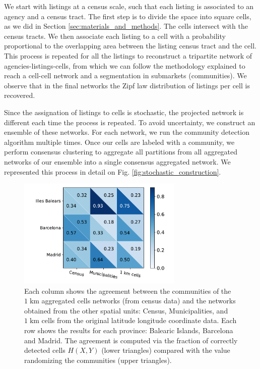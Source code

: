 We start with listings at a census scale, such that each listing is associated to an agency and a census tract. The first step is to divide the space into square cells, as we did in Section \ref{sec:materials_and_methods}. The cells intersect with the census tracts. We then associate each listing to a cell with a probability proportional to the overlapping area between the listing census tract and the cell. This process is repeated for all the listings to reconstruct a tripartite network of agencies-listings-cells, from which we can follow the methodology explained to reach a cell-cell network and a segmentation in submarkets (communities). 
We observe that in the final networks the Zipf law distribution of listings per cell is recovered.

Since the assignation of listings to cells is stochastic, the projected network is different each time the process is repeated. To avoid uncertainty, we construct an ensemble of these networks. For each network, we run the community detection algorithm multiple times. Once our cells are labeled with a community, we perform consensus clustering to aggregate all partitions from all aggregated networks of our ensemble into a single consensus aggregated network. We represented this process in detail on Fig. \ref{fig:stochastic_construction}.

\begin{figure}
    \centering
    \includegraphics[width = 0.7\textwidth]{Figs/Idealista_segmentation/Cells1000_agreement_AggCells.pdf}
	\caption[Comparison between the communities from aggregated cells network and other spatial units.]{ Each column shows the agreement between the communities of the $1 \; \textrm{km}$ aggregated cells networks (from census data) and the networks obtained from the other spatial units: Census, Municipalities, and $1 \; \textrm{km}$ cells from the original latitude longitude coordinate data. Each row shows the results for each province: Balearic Islands, Barcelona and Madrid. The agreement is computed via the fraction of correctly detected cells $H(X,Y)$ (lower triangles) compared with the value randomizing the communities (upper triangles). \label{fig:network_sector_distribution}}
\end{figure}

